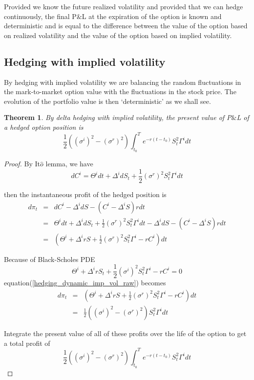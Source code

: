 \documentclass[10pt]{article}
\theoremstyle{plain}
\newtheorem{theorem}{Theorem}[section]
\numberwithin{equation}{section}
\numberwithin{table}{section}
\newcommand{\s}{\sigma}
\newcommand{\prt}[1]{\left( #1 \right)}  %
\begin{document}
Provided we know the future realized
volatility and provided that we can hedge continuously, the final P$\&$L
at the expiration of the option is known and deterministic and is equal to
the difference between the value of the option based on realized volatility
and the value of the option based on implied volatility.



\subsection{Hedging with implied volatility}
By hedging with implied volatility we are balancing
the random fluctuations in the mark-to-market option value with the
fluctuations in the stock price. The evolution of the portfolio value is
then ‘deterministic’ as we shall see.


\begin{theorem}
    By delta hedging with implied volatility, the present value of P$\&$L of a hedged option position is 
    \[
        \frac{1}{2}\prt{(\s^i)^2 - (\s^r)^2 }  \int_{t_0}^T e^{-r(t-t_0)}  S^2_t \Gamma^i dt  
    \]
    \label{theorem_hedging_imp_vol}
\end{theorem}

\begin{proof}
    By It$\hat{o}$ lemma, we have 
    \[
        dC^i =  \Theta^i dt+ \Delta^i dS_t + \frac{1}{2}(\s^r)^2 S^2_t \Gamma^i dt    
    \]

    then the instantaneous profit of the hedged position is
    \begin{eqnarray}
        d\pi_t &=& dC^i - \Delta^i dS - (C^i -\Delta^i S)rdt  \nonumber \\
        &=&  \Theta^i dt+ \Delta^i dS_t + \frac{1}{2}(\s^r)^2 S^2_t \Gamma^i dt  - \Delta^i dS - (C^i -\Delta^i S)rdt \nonumber \\
        &=&  \prt{ \Theta^i + \Delta^i rS + \frac{1}{2}(\s^r)^2 S^2_t \Gamma^i -  rC^i }dt 
        \label{hedging_dynamic_imp_vol_raw}
    \end{eqnarray}

    Because of Black-Scholes PDE
    \[
        \Theta^i + \Delta^i r S_t + \frac{1}{2}(\s^i)^2 S^2_t \Gamma^i - rC^i = 0
    \]
    equation(\ref{hedging_dynamic_imp_vol_raw}) becomes
    \begin{eqnarray*}
        d\pi_t &=& \prt{ \Theta^i + \Delta^i rS + \frac{1}{2}(\s^r)^2 S^2_t \Gamma^i -  rC^i }dt \\
            &=& \frac{1}{2}\prt{(\s^i)^2 - (\s^r)^2 } S^2_t \Gamma^i dt
    \end{eqnarray*}

    Integrate the present value of all of these profits over the life of the
    option to get a total profit of
    \[
        \frac{1}{2}\prt{(\s^i)^2 - (\s^r)^2 }  \int_{t_0}^T e^{-r(t-t_0)}  S^2_t \Gamma^i dt
    \]
    

\end{proof}
\end{document}

